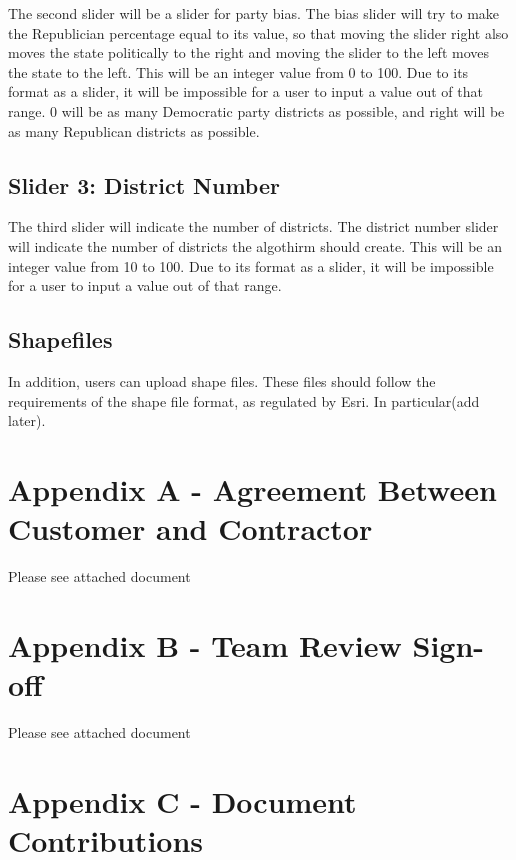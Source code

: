 \documentclass{article}
\begin{document}
The second slider will be a slider for party bias.  The bias slider will try to make the Republician percentage equal to its value, so that moving the slider right also moves the state politically to the right and moving the slider to the left moves the state to the left.  This will be an integer value from 0 to 100. Due to its format as a slider, it will be impossible for a user to input a value out of that range.  0 will be as many Democratic party districts as possible, and right will be as many Republican districts as possible.

\subsection{Slider 3: District Number}

The third slider will indicate the number of districts.  The district number slider will indicate the number of districts the algothirm should create.  This will be an integer value from 10 to 100.  Due to its format as a slider, it will be impossible for a user to input a value out of that range.

\subsection{Shapefiles}

In addition, users can upload shape files.  These files should follow the requirements of the shape file format, as regulated by Esri.  In particular(add later).











\section{Appendix A - Agreement Between Customer and Contractor}
Please see attached document
\section{Appendix B - Team Review Sign-off}
Please see attached document
\section{Appendix C - Document Contributions}

\vspace{2.5mm}
\end{document}
